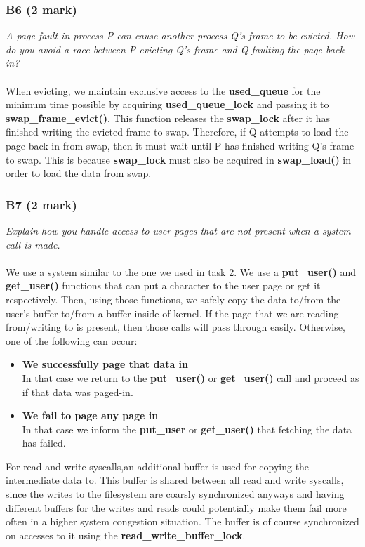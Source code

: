 \documentclass{report}
\newcommand{\question}[1]{\textit{#1} \ }
\newcommand{\bullpara}[2]{\item \textbf{#1} \ #2}
\newcommand{\fun}[1]{\textcolor{Emerald}{\textbf{#1}}}
\newcommand{\var}[1]{\textcolor{RoyalPurple}{\textbf{#1}}}
\newcommand{\compitem}[1]{\begin{itemize}\setlength\itemsep{-0.1em}#1\end{itemize}}
\begin{document}
			\subsubsection*{B6 (2 mark)}
				\question{A page fault in process P can cause another process Q's frame
				to be evicted. How do you avoid a race between P evicting Q's frame and 
				Q faulting the page back in?}
				\\
				\\ When evicting, we maintain exclusive access to the 
				\var{used\_queue} for the minimum time possible by acquiring 
				\var{used\_queue\_lock} and passing it to 
				\fun{swap\_frame\_evict()}. This function releases the 
				\var{swap\_lock} after it has finished writing the evicted frame
				to swap. Therefore, if Q attempts to load the page back in 
				from swap, then it must wait until P has finished writing Q's 
				frame to swap. This is because \var{swap\_lock} must also be 
				acquired in \fun{swap\_load()} in order to load the data from 
				swap.

			\subsubsection*{B7 (2 mark)}
				\question{Explain how you handle access to user pages that are not 
				present when a system call is made.}
				\\
				\\We use a system similar to the one we used in task 2.
				We use a \fun{put\_user()} and \fun{get\_user()} functions that
				can put a character to the user page or get it respectively. Then,
				using those functions, we safely copy the data to/from the user's buffer
				to/from a buffer inside of kernel. If the page that we are reading from/writing to
				is present, then those calls will pass through easily. Otherwise,
				one of the following can occur:
				\compitem{
					\bullpara{We successfully page that data in}{
					\\ In that case we return to the \fun{put\_user()} or \fun{get\_user()} call
					and proceed as if that data was paged-in.}
					\bullpara{We fail to page any page in}{
					\\ In that case we inform the \fun{put\_user{}} or \fun{get\_user()} that fetching
					the data has failed.}
				}
				For read and write syscalls,an additional buffer is used for copying the intermediate data to.
				This buffer is shared between all read and write syscalls, since the writes
				to the filesystem are coarsly synchronized anyways and having different buffers for the writes and reads
				could potentially make them fail more often in a higher system congestion situation. The buffer is of course
				synchronized on accesses to it using the \var{read\_write\_buffer\_lock}.
			
\end{document}
